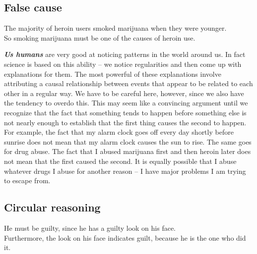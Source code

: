 \documentclass[12pt, openany]{book}
\begin{document}
\hypertarget{false-cause}{%
\subsection*{False cause}\label{false-cause}}


\begin{center}

\begin{argument}

The majority of heroin users smoked marijuana when they were younger.\\
So smoking marijuana must be one of the causes of heroin use.

\end{argument}

\end{center}

\textbf{\emph{Us humans}} are very good at noticing patterns in the world around us. In fact science is based on this ability -- we notice regularities and then come up with explanations for them. The most powerful of these explanations involve attributing a causal relationship between events that appear to be related to each other in a regular way. We have to be careful here, however, since we also have the tendency to overdo this. This may seem like a convincing argument until we recognize that the fact that something tends to happen before something else is not nearly enough to establish that the first thing causes the second to happen. For example, the fact that my alarm clock goes off every day shortly before sunrise does not mean that my alarm clock causes the sun to rise. The same goes for drug abuse. The fact that I abused marijuana first and then heroin later does not mean that the first caused the second. It is equally possible that I abuse whatever drugs I abuse for another reason -- I have major problems I am trying to escape from.

\hypertarget{circular-reasoning}{%
\subsection*{Circular reasoning}\label{circular-reasoning}}


\begin{center}

\begin{argument}

He must be guilty, since he has a guilty look on his face.\\

Furthermore, the look on his face indicates guilt, because he is the one who did it.

\end{argument}

\end{center}
\end{document}
